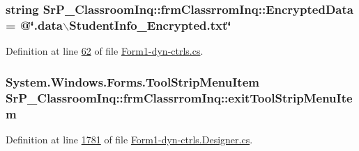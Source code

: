\hypertarget{class_sr_p___classroom_inq_1_1frm_classrrom_inq_a3128c84ccd476a8a2e02bedab0ecc031}{
\subsubsection[{\-Encrypted\-Data}]{\setlength{\rightskip}{0pt plus 5cm}string {\bf \-Sr\-P\-\_\-\-Classroom\-Inq\-::frm\-Classrrom\-Inq\-::\-Encrypted\-Data} = @\char`\"{}.data$\backslash$\-Student\-Info\-\_\-\-Encrypted.\-txt\char`\"{}}}
\label{class_sr_p___classroom_inq_1_1frm_classrrom_inq_a3128c84ccd476a8a2e02bedab0ecc031}


\-Definition at line \hyperlink{_form1-dyn-ctrls_8cs_source_l00062}{62} of file \hyperlink{_form1-dyn-ctrls_8cs_source}{\-Form1-\/dyn-\/ctrls.\-cs}.

\hypertarget{class_sr_p___classroom_inq_1_1frm_classrrom_inq_a676112a698472361a000699f774d38ca}{
\subsubsection[{exit\-Tool\-Strip\-Menu\-Item}]{\setlength{\rightskip}{0pt plus 5cm}\-System.\-Windows.\-Forms.\-Tool\-Strip\-Menu\-Item {\bf \-Sr\-P\-\_\-\-Classroom\-Inq\-::frm\-Classrrom\-Inq\-::exit\-Tool\-Strip\-Menu\-Item}}}
\label{class_sr_p___classroom_inq_1_1frm_classrrom_inq_a676112a698472361a000699f774d38ca}


\-Definition at line \hyperlink{_form1-dyn-ctrls_8_designer_8cs_source_l01781}{1781} of file \hyperlink{_form1-dyn-ctrls_8_designer_8cs_source}{\-Form1-\/dyn-\/ctrls.\-Designer.\-cs}.

